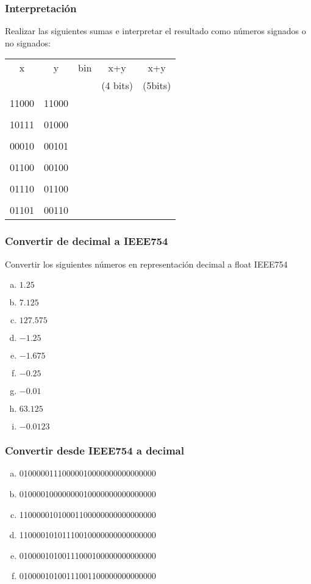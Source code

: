 \subsubsection{Interpretación}
Realizar las siguientes sumas e interpretar el resultado como números signados o no signados:\\

\begin{tabular}{ccccc}
x&y&bin&x+y&x+y\\
&&&(4 bits)&(5bits)\\
11000&11000&\underspace&\underspace&\underspace\\
&&&&\\
10111&01000&\underspace&\underspace&\underspace\\
&&&&\\
00010&00101&\underspace&\underspace&\underspace\\
&&&&\\
01100&00100&\underspace&\underspace&\underspace\\
&&&&\\
01110&01100&\underspace&\underspace&\underspace\\
&&&&\\
01101&00110&\underspace&\underspace&\underspace\\
\end{tabular}

\subsubsection{Convertir de decimal a IEEE754}
Convertir los siguientes números en representación decimal a float IEEE754
\begin{enumerate}[a)]
  \item $1.25$
  \item $7.125$
  \item $127.575$
  \item $-1.25$
  \item $-1.675$
  \item $-0.25$
  \item $-0.01$
  \item $63.125$
  \item $-0.0123$
\end{enumerate}

\subsubsection{Convertir desde IEEE754 a decimal}
\begin{enumerate}[a)]
  \item 01000001110000010000000000000000
  \item 01000010000000010000000000000000
  \item 11000001010001100000000000000000
  \item 11000010101110010000000000000000
  \item 01000010100111000100000000000000
  \item 01000010100111001100000000000000
\end{enumerate}

